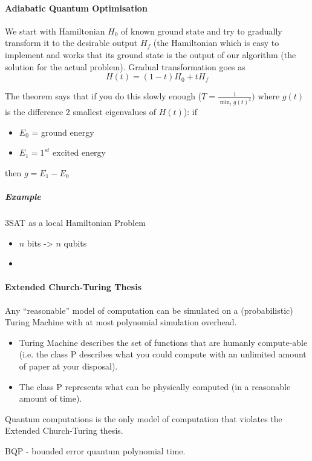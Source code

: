 \documentclass{scrartcl}
\newcommand{\video}[2]{ } %
\begin{document}
\paragraph{Adiabatic Quantum Optimisation}

We start with Hamiltonian $H_0$ of known ground state and try to gradually
transform it to the desirable output $H_f$ (the Hamiltonian which is easy to
implement and works that its ground state is the output of our algorithm (the
solution for the actual problem). Gradual transformation goes as
$$H(t) = (1-t)H_0 + tH_f$$ 

The theorem says that if you do this slowly enough ($T=\frac1{\min_t g(t)^2})$
where $g(t)$ is the difference 2 smallest eigenvalues of $H(t)$): if
\begin{itemize}
\item $E_0$ = ground energy
\item $E_1 = 1^{st}$ excited energy
\end{itemize}
then $g = E_1-E_0$

\subparagraph{Example} 3SAT as a local Hamiltonian Problem
\video{16-2}{09:24}

\begin{itemize}
\item $n$ bits -> $n$ qubits
\item 
\end{itemize}

\paragraph{Extended Church-Turing Thesis}

Any ``reasonable'' model of computation can be simulated on a (probabilistic)
Turing Machine with at most polynomial simulation overhead.
\begin{itemize}
\item Turing Machine describes the set of functions that are humanly
  compute-able (i.e. the class P describes what you could compute with an
  unlimited amount of paper at your disposal).
\item The class P represents what can be physically computed (in a reasonable
  amount of time).
\end{itemize}

Quantum computations is the only model of computation that violates the Extended
Church-Turing thesis.

BQP - bounded error quantum polynomial time.
\end{document}
